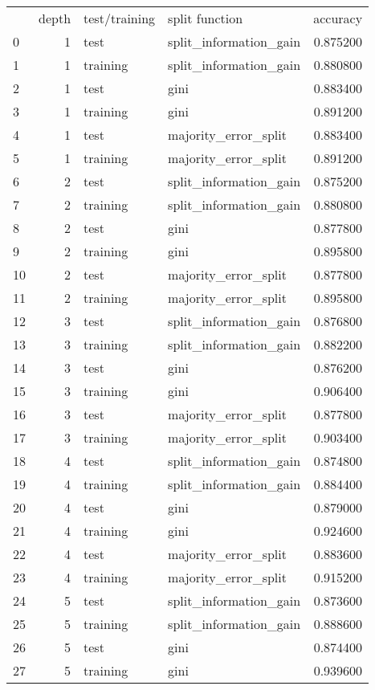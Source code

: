 \begin{tabular}{lrllr}
 & depth & test/training & split function & accuracy \\
0 & 1 & test & split_information_gain & 0.875200 \\
1 & 1 & training & split_information_gain & 0.880800 \\
2 & 1 & test & gini & 0.883400 \\
3 & 1 & training & gini & 0.891200 \\
4 & 1 & test & majority_error_split & 0.883400 \\
5 & 1 & training & majority_error_split & 0.891200 \\
6 & 2 & test & split_information_gain & 0.875200 \\
7 & 2 & training & split_information_gain & 0.880800 \\
8 & 2 & test & gini & 0.877800 \\
9 & 2 & training & gini & 0.895800 \\
10 & 2 & test & majority_error_split & 0.877800 \\
11 & 2 & training & majority_error_split & 0.895800 \\
12 & 3 & test & split_information_gain & 0.876800 \\
13 & 3 & training & split_information_gain & 0.882200 \\
14 & 3 & test & gini & 0.876200 \\
15 & 3 & training & gini & 0.906400 \\
16 & 3 & test & majority_error_split & 0.877800 \\
17 & 3 & training & majority_error_split & 0.903400 \\
18 & 4 & test & split_information_gain & 0.874800 \\
19 & 4 & training & split_information_gain & 0.884400 \\
20 & 4 & test & gini & 0.879000 \\
21 & 4 & training & gini & 0.924600 \\
22 & 4 & test & majority_error_split & 0.883600 \\
23 & 4 & training & majority_error_split & 0.915200 \\
24 & 5 & test & split_information_gain & 0.873600 \\
25 & 5 & training & split_information_gain & 0.888600 \\
26 & 5 & test & gini & 0.874400 \\
27 & 5 & training & gini & 0.939600 \\

\end{tabular}
